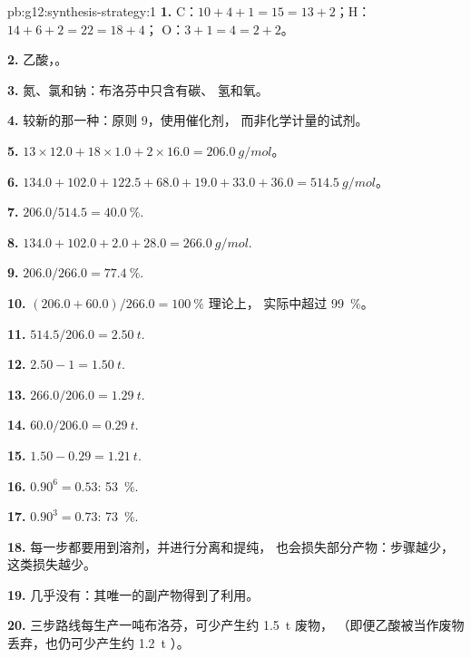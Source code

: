 \begin{solution}{pb:g12:synthesis-strategy:1}
\textbf{1.} C：$10 + 4 + 1 = 15 = 13 + 2$；H：$14 + 6 + 2 = 22 = 18 + 4$；
O：$3 + 1 = 4 = 2 + 2$。

\textbf{2.} 乙酸，。

\textbf{3.} 氮、氯和钠：布洛芬中只含有碳、
氢和氧。

\textbf{4.} 较新的那一种：原则 9，使用催化剂，
而非化学计量的试剂。

\textbf{5.} $13 \times 12.0 + 18 \times 1.0 + 2 \times 16.0 =
\qty{206.0}{g/mol}$。

\textbf{6.} $134.0 + 102.0 + 122.5 + 68.0 + 19.0 + 33.0 + 36.0 =
\qty{514.5}{g/mol}$。

\textbf{7.} $206.0/514.5 = \qty{40.0}{\percent}$.

\textbf{8.} $134.0 + 102.0 + 2.0 + 28.0 = \qty{266.0}{g/mol}$.

\textbf{9.} $206.0/266.0 = \qty{77.4}{\percent}$.

\textbf{10.} $(206.0 + 60.0)/266.0 = \qty{100}{\percent}$ 理论上，
实际中超过 \qty{99}{\percent}。

\textbf{11.} $514.5/206.0 = \qty{2.50}{t}$.

\textbf{12.} $2.50 - 1 = \qty{1.50}{t}$.

\textbf{13.} $266.0/206.0 = \qty{1.29}{t}$.

\textbf{14.} $60.0/206.0 = \qty{0.29}{t}$.

\textbf{15.} $1.50 - 0.29 = \qty{1.21}{t}$.

\textbf{16.} $0.90^6 = 0.53$: \qty{53}{\percent}.

\textbf{17.} $0.90^3 = 0.73$: \qty{73}{\percent}.

\textbf{18.} 每一步都要用到溶剂，并进行分离和提纯，
也会损失部分产物：步骤越少，这类损失越少。

\textbf{19.} 几乎没有：其唯一的副产物得到了利用。

\textbf{20.} 三步路线每生产一吨布洛芬，可少产生约 \qty{1.5}{t} 废物，
（即便乙酸被当作废物丢弃，也仍可少产生约 \qty{1.2}{t}
）。
\end{solution}

